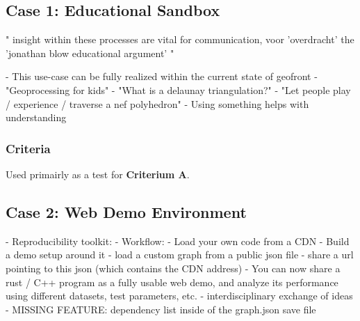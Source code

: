 \subsection*{Case 1: Educational Sandbox}

"
insight within these processes are vital for communication, voor 'overdracht' 
the 'jonathan blow educational argument' 
"

- This use-case can be fully realized within the current state of geofront
- "Geoprocessing for kids"
- "What is a delaunay triangulation?" 
- "Let people play / experience / traverse a nef polyhedron"
- Using something helps with understanding

\subsubsection*{Criteria}
Used primairly as a test for \textbf{Criterium A}.


\subsection*{Case 2: Web Demo Environment}

- Reproducibility toolkit:
- Workflow: 
  - Load your own code from a CDN
  - Build a demo setup around it
  - load a custom graph from a public json file
  - share a url pointing to this json (which contains the CDN address)
- You can now share a rust / C++ program as a fully usable web demo,   
  and analyze its performance using different datasets, test parameters, etc. 
- interdisciplinary exchange of ideas
- MISSING FEATURE: dependency list inside of the graph.json save file



